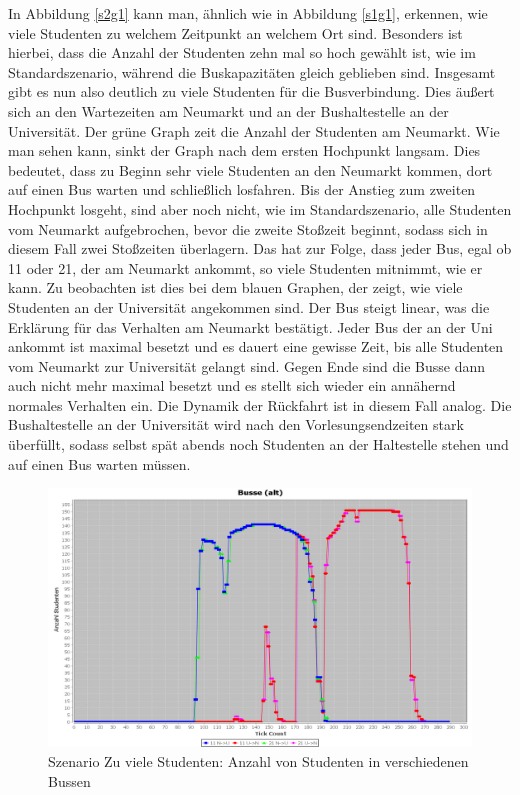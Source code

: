 \documentclass[12pt,a4paper]{scrartcl}
\begin{document}
In Abbildung \ref{s2g1} kann man, ähnlich wie in Abbildung \ref{s1g1}, erkennen, wie viele Studenten zu welchem Zeitpunkt an welchem Ort sind. Besonders ist hierbei, dass die Anzahl der Studenten zehn mal so hoch gewählt ist, wie im Standardszenario, während die Buskapazitäten gleich geblieben sind. Insgesamt gibt es nun also deutlich zu viele Studenten für die Busverbindung. Dies äußert sich an den Wartezeiten am Neumarkt und an der Bushaltestelle an der Universität.
Der grüne Graph zeit die Anzahl der Studenten am Neumarkt. Wie man sehen kann, sinkt der Graph  nach dem ersten Hochpunkt langsam. Dies bedeutet, dass zu Beginn sehr viele Studenten an den Neumarkt kommen, dort auf einen Bus warten und schließlich losfahren. Bis der Anstieg zum zweiten Hochpunkt losgeht, sind aber noch nicht, wie im Standardszenario, alle Studenten vom Neumarkt aufgebrochen, bevor die zweite Stoßzeit beginnt, sodass sich in diesem Fall zwei Stoßzeiten überlagern. Das hat zur Folge, dass jeder Bus, egal ob 11 oder 21, der am Neumarkt ankommt, so viele Studenten mitnimmt, wie er kann. Zu beobachten ist dies bei dem blauen Graphen, der zeigt, wie viele Studenten an der Universität angekommen sind. Der Bus steigt linear, was die Erklärung für das Verhalten am Neumarkt bestätigt. Jeder Bus der an der Uni ankommt ist maximal besetzt und es dauert eine gewisse Zeit, bis alle Studenten vom Neumarkt zur Universität gelangt sind. Gegen Ende sind die Busse dann auch nicht mehr maximal besetzt und es stellt sich wieder ein annähernd normales Verhalten ein. 
Die Dynamik der Rückfahrt ist in diesem Fall analog. Die Bushaltestelle an der Universität wird nach den Vorlesungsendzeiten stark überfüllt, sodass selbst spät abends noch Studenten an der Haltestelle stehen und auf einen Bus warten müssen. 

\begin{figure}
\includegraphics[scale=0.4]{Viele_Studenten_Busse.png}
\caption{Szenario \glqq Zu viele Studenten\grqq : Anzahl von Studenten in verschiedenen Bussen}
\label{s2g2}
\end{figure}
\end{document}
